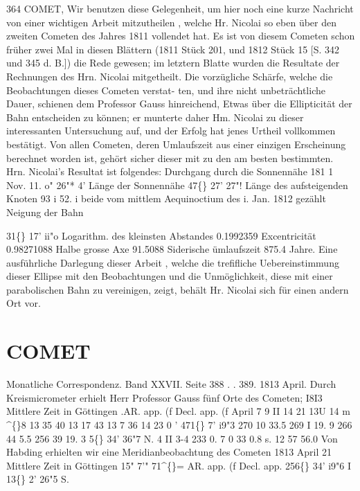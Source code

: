 \documentclass[12pt,a4paper]{article}
\newcommand{\degree}{\textdegree}
\begin{document}
\newpage
364 
COMET, 
Wir  benutzen  diese  Gelegenheit,  um  hier  noch  eine  kurze  Nachricht  von  einer  wichtigen  Arbeit 
mitzutheilen ,  welche  Hr.  Nicolai  so  eben  über  den  zweiten  Cometen  des  Jahres  1811  vollendet  hat.  Es 
ist  von  diesem  Cometen  schon  früher  zwei  Mal  in  diesen  Blättern  (1811  Stück  201,  und  1812  Stück  15 
[S.  342  und  345  d.  B.])  die  Rede  gewesen;  im  letztern  Blatte  wurden  die  Resultate  der  Rechnungen  des 
Hrn.  Nicolai  mitgetheilt.  Die  vorzügliche  Schärfe,  welche  die  Beobachtungen  dieses  Cometen  verstat- 
ten, und  ihre  nicht  unbeträchtliche  Dauer,  schienen  dem  Professor  Gauss  hinreichend,  Etwas  über  die 
Ellipticität  der  Bahn  entscheiden  zu  können;  er  munterte  daher  Hm.  Nicolai  zu  dieser  interessanten 
Untersuchung  auf,  und  der  Erfolg  hat  jenes  Urtheil  vollkommen  bestätigt.  Von  allen  Cometen,  deren 
Umlaufszeit  aus  einer  einzigen  Erscheinung  berechnet  worden  ist,  gehört  sicher  dieser  mit  zu  den  am 
besten  bestimmten.    Hrn.  Nicolai's  Resultat  ist  folgendes: 
Durchgang  durch  die  Sonnennähe  181 1  Nov.  11.  o"  26"*  4' 
Länge  der  Sonnennähe   
47\degree\{\}  27'    27"! 
Länge  des  aufsteigenden  Knoten   
93      i    52.  i 
beide  vom  mittlem  Aequinoctium  des  i.  Jan.  1812  gezählt 
Neigung  der  Bahn       

31\degree\{\}  17'    ii"o 
Logarithm.  des  kleinsten  Abstandes   
0.1992359 
Excentricität   
0.98271088 
Halbe  grosse  Axe   
91.5088 
Siderische  ümlaufszeit   
875.4  Jahre. 
Eine  ausführliche  Darlegung  dieser  Arbeit ,  welche  die  trefifliche  Uebereinstimmung  dieser  Ellipse 
mit  den  Beobachtungen  und  die  Unmöglichkeit,  diese  mit  einer  parabolischen  Bahn  zu  vereinigen,  zeigt, 
behält  Hr.  Nicolai  sich  für  einen  andern  Ort  vor. 

\section*{COMET}
Monatliche  Correspondenz.     Band  XXVII.  Seite  388  .  .  389.     1813  April. 
Durch  Kreismicrometer  erhielt  Herr  Professor  Gauss  fünf  Orte  des  Cometen; 
I8I3 
Mittlere  Zeit 
in  Göttingen 
.AR.  app.  (f 
Decl.  app.  (f 
April  7 
9 
II 
14 
21 
13U    14 m    \textasciicircum\{\}8 
13     35     40 
13     17     43 
13  7     36 
14  23       0 
'     471\degree\{\}     7'    i9"3 
270     10     33.5 
269       I     19. 9 
266     44      5.5 
256     39     19. 3 
5\degree\{\}  34'    36"7  N. 
4     II       3-4 
233       0. 7 
0    33     0.8  s. 
12       57       56.0 
Von  Habding  erhielten  wir  eine  Meridianbeobachtung  des  Cometen 
1813 
April  21 
Mittlere  Zeit 
in  Göttingen 
15"  7'"  71\textasciicircum\{\}= 
AR.  app.  (f         Decl.  app. 
256\degree\{\}  34'    i9"6     I     13\degree\{\}  2'    26"5  S. 
\end{document}
